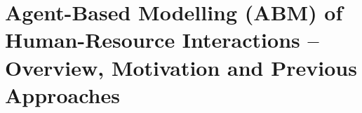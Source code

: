 \section{Agent-Based Modelling (ABM) of Human-Resource Interactions -- Overview, Motivation and Previous Approaches}

